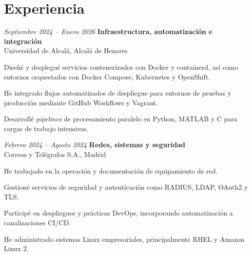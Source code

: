 \vspace{-7pt}

\section{Experiencia}

\begin{twocolentry}{\textit{Septiembre 2024 -- Enero 2026}}
	\textbf{Infraestructura, automatización e integración} \\
	Universidad de Alcalá, Alcalá de Henares
\end{twocolentry}
\begin{onecolentry}
	\begin{highlights}
		\item Diseñé y desplegué servicios contenerizados con Docker y containerd, así como entornos orquestados con Docker Compose, Kubernetes y OpenShift.
		\item He integrado flujos automatizados de despliegue para entornos de pruebas y producción mediante GitHub Workflows y Vagrant.
		\item Desarrollé \textit{pipelines} de procesamiento paralelo en Python, MATLAB y C para cargas de trabajo intensivas.
	\end{highlights}
\end{onecolentry}

\vspace{0.2 cm}

\begin{twocolentry}{\textit{Febrero 2024 -- Agosto 2024}}
	\textbf{Redes, sistemas y seguridad} \\
	Correos y Telégrafos S.A., Madrid
\end{twocolentry}
\begin{onecolentry}
	\begin{highlights}
		\item He trabajado en la operación y documentación de equipamiento de red.
		\item Gestioné servicios de seguridad y autenticación como RADIUS, LDAP, OAuth2 y TLS.
		\item Participé en despliegues y prácticas DevOps, incorporando automatización a canalizaciones CI/CD.
		\item He administrado sistemas Linux empresariales, principalmente RHEL y Amazon Linux 2.
	\end{highlights}
\end{onecolentry}

